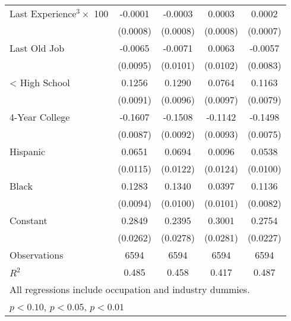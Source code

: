 {\begin{longtable}{l*{4}{c}}
Last Experience$^3 \times$ 100&     -0.0001         &     -0.0003         &      0.0003         &      0.0002         \\
                    &    (0.0008)         &    (0.0008)         &    (0.0008)         &    (0.0007)         \\
Last Old Job        &     -0.0065         &     -0.0071         &      0.0063         &     -0.0057         \\
                    &    (0.0095)         &    (0.0101)         &    (0.0102)         &    (0.0083)         \\
< High School       &      0.1256\sym{***}&      0.1290\sym{***}&      0.0764\sym{***}&      0.1163\sym{***}\\
                    &    (0.0091)         &    (0.0096)         &    (0.0097)         &    (0.0079)         \\
4-Year College      &     -0.1607\sym{***}&     -0.1508\sym{***}&     -0.1142\sym{***}&     -0.1498\sym{***}\\
                    &    (0.0087)         &    (0.0092)         &    (0.0093)         &    (0.0075)         \\
Hispanic            &      0.0651\sym{***}&      0.0694\sym{***}&      0.0096         &      0.0538\sym{***}\\
                    &    (0.0115)         &    (0.0122)         &    (0.0124)         &    (0.0100)         \\
Black               &      0.1283\sym{***}&      0.1340\sym{***}&      0.0397\sym{***}&      0.1136\sym{***}\\
                    &    (0.0094)         &    (0.0100)         &    (0.0101)         &    (0.0082)         \\
Constant            &      0.2849\sym{***}&      0.2395\sym{***}&      0.3001\sym{***}&      0.2754\sym{***}\\
                    &    (0.0262)         &    (0.0278)         &    (0.0281)         &    (0.0227)         \\
\hline  
Observations        &        6594         &        6594         &        6594         &        6594         \\
\(R^{2}\)           &       0.485         &       0.458         &       0.417         &       0.487         \\
\hline  
\multicolumn{5}{l}{\footnotesize All regressions include occupation and industry dummies.}\\
\multicolumn{5}{l}{\footnotesize \sym{*} \(p<0.10\), \sym{**} \(p<0.05\), \sym{***} \(p<0.01\)}\\
\end{longtable}
}
